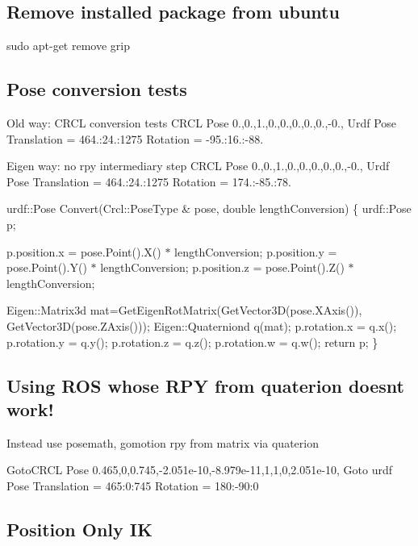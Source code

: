 \subsection*{Remove installed package from ubuntu }

sudo apt-\/get remove grip

\subsection*{Pose conversion tests }

Old way\-: C\-R\-C\-L conversion tests C\-R\-C\-L Pose 0.,0.,1.,0.,0.,0.,0.,0.,-\/0., Urdf Pose Translation = 464.\-:24.\-:1275 Rotation = -\/95.\-:16.\-:-\/88.

Eigen way\-: no rpy intermediary step C\-R\-C\-L Pose 0.,0.,1.,0.,0.,0.,0.,0.,-\/0., Urdf Pose Translation = 464.\-:24.\-:1275 Rotation = 174.\-:-\/85.\-:78.

urdf\-::\-Pose Convert(\-Crcl\-::\-Pose\-Type \& pose, double length\-Conversion) \{ urdf\-::\-Pose p;

p.\-position.\-x = pose.\-Point().X() $\ast$ length\-Conversion; p.\-position.\-y = pose.\-Point().Y() $\ast$ length\-Conversion; p.\-position.\-z = pose.\-Point().Z() $\ast$ length\-Conversion;

Eigen\-::\-Matrix3d mat=Get\-Eigen\-Rot\-Matrix(Get\-Vector3\-D(pose.\-X\-Axis()), Get\-Vector3\-D(pose.\-Z\-Axis())); Eigen\-::\-Quaterniond q(mat); p.\-rotation.\-x = q.\-x(); p.\-rotation.\-y = q.\-y(); p.\-rotation.\-z = q.\-z(); p.\-rotation.\-w = q.\-w(); return p; \}

\subsection*{Using R\-O\-S whose R\-P\-Y from quaterion doesnt work! }

Instead use posemath, gomotion rpy from matrix via quaterion \begin{DoxyVerb}GotoCRCL Pose 0.465,0,0.745,-2.051e-10,-8.979e-11,1,1,0,2.051e-10,
Goto urdf Pose Translation = 465:0:745
Rotation = 180:-90:0
\end{DoxyVerb}


\subsection*{Position Only I\-K }

